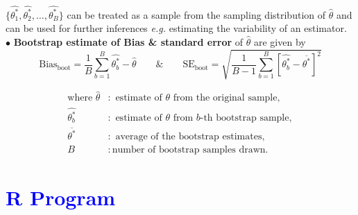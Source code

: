 \documentclass[11pt, a4paper]{article}\usepackage[]{graphicx}\usepackage[]{xcolor}
\begin{document}
$\{\widehat{\theta_{1}^{*}}, \widehat{\theta_{2}^{*}}, \ldots, \widehat{\theta_{B}^{*}}\}$ can be treated as a sample from the sampling distribution of $\hat{\theta}$ and can be used for further inferences \textit{e.g.} estimating the variability of an estimator. \\[0.3em]

$\bullet$ \textbf{Bootstrap estimate of Bias \& standard error} of $\hat{\theta}$ are given by $$\text{Bias}_{\text{boot}} = \dfrac{1}{B} \sum \limits_{b = 1}^{B} \widehat{\theta_{b}^{*}} - \hat{\theta} \qquad \& \qquad \text{SE}_{\text{boot}} = \sqrt{\dfrac{1}{B-1} \sum \limits_{b = 1}^{B} \left[\widehat{\theta_{b}^{*}} - \overline{\theta^*}\right]^2}$$

\begin{align*}
\text{where } \hat{\theta} &: \text{ estimate of } \theta \text{ from the original sample}, \\[0.2em]
\widehat{\theta_{b}^{*}} &: \text{ estimate of } \theta \text{ from } b\text{-th bootstrap sample}, \\[0.2em]
\overline{\theta^*} &: \text{ average of the bootstrap estimates}, \\[0.2em]
B &: \text{number of bootstrap samples drawn}.
\end{align*}

\newpage

\section*{\faArrowAltCircleRight[regular] \textcolor{blue}{R Program}}
\end{document}
